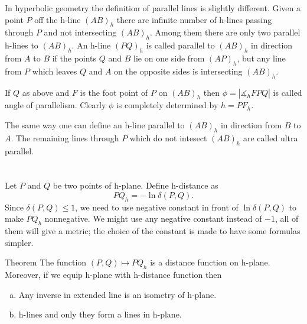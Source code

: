  
 
 
 
 
 
 
 
 
 In hyperbolic geometry the definition of parallel lines is slightly different.
Given a point $P$ off the h-line $(AB)_h$ 
there are infinite number of h-lines passing through $P$ and not intersecting $(AB)_h$. 
Among them there are only two parallel h-lines to $(AB)_h$. 
An h-line $(PQ)_h$ is called parallel to $(AB)_h$
in direction from $A$ to $B$ if the points $Q$ and $B$ lie on one side from $(AP)_h$, but any line from $P$ which leaves $Q$ and $A$ on the opposite sides is intersecting $(AB)_h$.

If $Q$ as above and $F$ is the foot point of $P$ on $(AB)_h$ then $\phi=|\measuredangle_h FPQ|$ is called angle of parallelism.
Clearly $\phi$ is completely determined by $h=PF_h$.

The same way one can define an h-line parallel to $(AB)_h$
in direction from $B$ to $A$.
The remaining lines through $P$ which do not intesect $(AB)_h$ are called ultra parallel.












\section{}

Let $P$ and $Q$ be two points of h-plane.
Define h-distance  as 
$$PQ_h=-\ln\delta(P,Q).$$
Since $\delta(P,Q)\le 1$, we need to use negative constant in front of $\ln\delta(P,Q)$ to make $PQ_h$ nonnegative.
We might use any negative constant instead of $-1$, all of them will give a metric; the choice of the constant is made to have some formulas simpler.


\begin{thm}{Theorem} \label{lem:h-dist}
The function $(P,Q)\mapsto PQ_h$ is a distance function on h-plane.
Moreover, if we equip h-plane with h-distance function then
\begin{enumerate}[(a)]
\item Any inverse in extended line is an isometry of h-plane.
\item  h-lines and only they form a lines in h-plane.
\end{enumerate}
\end{thm}



